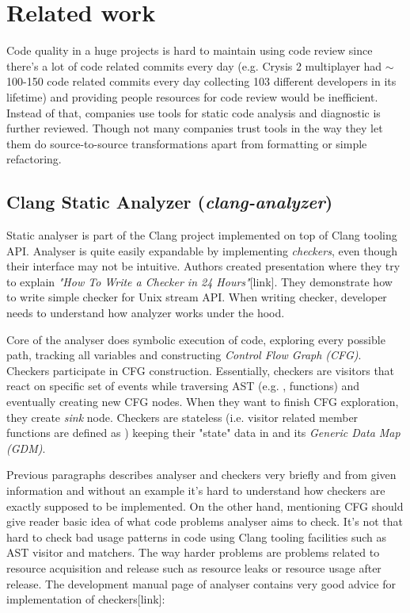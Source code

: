 \section{Related work}
Code quality in a huge projects is hard to maintain using code review since there's a lot of code related commits every day (e.g. Crysis 2 multiplayer had $\sim$100-150 code related commits every day collecting 103 different developers in its lifetime) and providing people resources for code review would be inefficient. Instead of that, companies use tools for static code analysis and diagnostic is further reviewed. Though not many companies trust tools in the way they let them do source-to-source transformations apart from formatting or simple refactoring.

\subsection{Clang Static Analyzer (\emph{clang-analyzer})}
Static analyser is part of the Clang project implemented on top of Clang tooling API. Analyser is quite easily expandable by implementing \emph{checkers}, even though their interface may not be intuitive. Authors created presentation where they try to explain \emph{"How To Write a Checker in 24 Hours"}[link]. They demonstrate how to write simple checker for  Unix stream API. When writing checker, developer needs to understand how analyzer works under the hood.

Core of the analyser does symbolic execution of code, exploring every possible path, tracking all variables and constructing \emph{Control Flow Graph (CFG)}. Checkers participate in CFG construction. Essentially, checkers are visitors that react on specific set of events while traversing AST (e.g. ,  functions) and eventually creating new CFG nodes. When they want to finish CFG exploration, they create \emph{sink} node. Checkers are stateless (i.e. visitor related member functions are defined as ) keeping their "state" data in  and its \emph{Generic Data Map (GDM)}.

Previous paragraphs describes analyser and checkers very briefly and from given information and without an example it's hard to understand how checkers are exactly supposed to be implemented. On the other hand, mentioning CFG should give reader basic idea of what code problems analyser aims to check. It's not that hard to check bad usage patterns in code using Clang tooling facilities such as AST visitor and matchers. The way harder problems are problems related to resource acquisition and release such as resource leaks or resource usage after release. The development manual page of analyser contains very good advice for implementation of checkers[link]:\\

